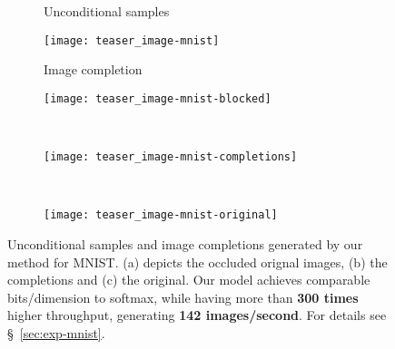 \documentclass{article}
\begin{document}
\begin{figure}[h]
    \centering
    \begin{subfigure}[t]{0.9\columnwidth}
        \centering
        Unconditional samples
    \end{subfigure}
    \begin{subfigure}[t]{0.9\columnwidth}
        \texttt{[image: teaser\_image-mnist]}
        \vspace{0.3em}
    \end{subfigure}
    \begin{subfigure}[t]{0.9\columnwidth}
        \centering
        Image completion
    \end{subfigure}
    \begin{subfigure}[t]{0.0971\columnwidth}
        \texttt{[image: teaser\_image-mnist-blocked]}
        \caption{}
    \end{subfigure}\,\,
    \begin{subfigure}[t]{0.6\columnwidth}
        \texttt{[image: teaser\_image-mnist-completions]}
        \caption{}
    \end{subfigure}\,\,
    \begin{subfigure}[t]{0.0971\columnwidth}
        \texttt{[image: teaser\_image-mnist-original]}
        \caption{}
    \end{subfigure}
    \caption{Unconditional samples and image completions generated by our
             method for MNIST. (a) depicts the occluded orignal images, (b) the
             completions and (c) the original. Our model achieves comparable
             bits/dimension to softmax, while having more than
             \textbf{300 times} higher throughput, generating \textbf{142
             images/second}. For details see \S~\ref{sec:exp-mnist}.}
    \label{fig:mnist-images}
\end{figure}
\end{document}
